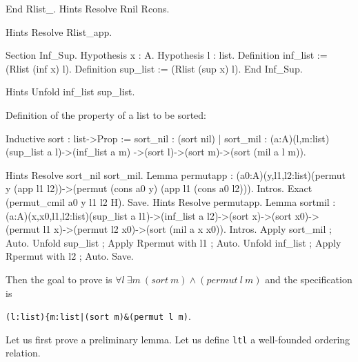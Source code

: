 \begin{coq_example*}
End Rlist_.
Hints Resolve Rnil Rcons.
\end{coq_example*}
\begin{coq_eval}
Hints Resolve Rlist_app.
\end{coq_eval}
\begin{coq_example*}
Section Inf_Sup.
Hypothesis x : A.
Hypothesis l : list.
Definition inf_list := (Rlist (inf x) l).
Definition sup_list := (Rlist (sup x) l).
End Inf_Sup.
\end{coq_example*}
\begin{coq_eval}
Hints Unfold  inf_list sup_list.
\end{coq_eval}
Definition of the property of a list to be sorted:
\begin{coq_example*}
Inductive sort : list->Prop :=
     sort_nil : (sort nil)
   | sort_mil : (a:A)(l,m:list)(sup_list a l)->(inf_list a m)
        ->(sort l)->(sort m)->(sort (mil a l m)).
\end{coq_example*}
\begin{coq_eval}
Hints Resolve sort_nil sort_mil.
Lemma permutapp : (a0:A)(y,l1,l2:list)(permut y (app l1 l2))->(permut (cons a0 y) (app l1 (cons a0 l2))).
Intros.
Exact (permut_cmil a0 y l1 l2 H).
Save.
Hints Resolve permutapp.
Lemma sortmil : (a:A)(x,x0,l1,l2:list)(sup_list a l1)->(inf_list a l2)->(sort x)->(sort x0)->(permut l1 x)->(permut l2 x0)->(sort (mil a x x0)).
Intros.
Apply sort_mil ; Auto.
Unfold sup_list ; Apply Rpermut with l1 ; Auto. 
Unfold inf_list ; Apply Rpermut with l2 ; Auto.
Save.
\end{coq_eval}

\noindent Then the goal to prove is 
$\forall l~\exists m~(sort~m) \wedge (permut~l~m)$ and the specification is 

\verb!(l:list){m:list|(sort m)&(permut l m)!.

\noindent Let us first prove a preliminary lemma. Let us define \verb=ltl= a
well-founded ordering relation.

